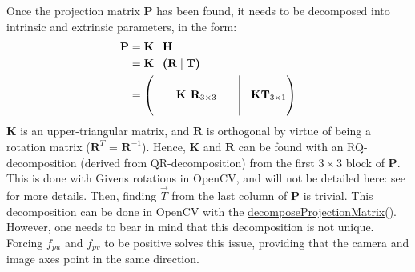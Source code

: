 Once the projection matrix $\textbf{P}$ has been found, it needs to be decomposed into intrinsic and extrinsic parameters, in the form:
\begin{equation} 
  \begin{aligned}
      \textbf{P} &= \textbf{K \ H} \\
                 &= \textbf{K \ (R\ \vline \ T)} \\
                 &= \begin{pmatrix}& & & &\vline & \\ && \textbf{K R}_{3\times 3} & & \vline & \textbf{KT}_{3\times 1}\\ &&&&\vline&\end{pmatrix}
  \end{aligned}
\end{equation}   
$\textbf{K}$ is an upper-triangular matrix, and $\textbf{R}$ is orthogonal by virtue of being a rotation matrix ($\textbf{R}^T$ = $\textbf{R}^{-1}$). Hence, $\textbf{K}$ and $\textbf{R}$ can be found with an RQ-decomposition (derived from QR-decomposition) from the first $3 \times 3$ block of $\textbf{P}$. This is done with Givens rotations in OpenCV, and will not be detailed here: see \cite{Bradski2000, Hartley2003} for more details. Then, finding $\overrightarrow{T}$ from the last column of $\textbf{P}$ is trivial. This decomposition can be done in OpenCV with the \href{https://docs.opencv.org/4.x/d9/d0c/group__calib3d.html#gaaae5a7899faa1ffdf268cd9088940248}{decomposeProjectionMatrix()}. However, one needs to bear in mind that this decomposition is not unique. Forcing $f_{pu}$ and $f_{pv}$ to be positive solves this issue, providing that the camera and image axes point in the same direction. 

\newpage


